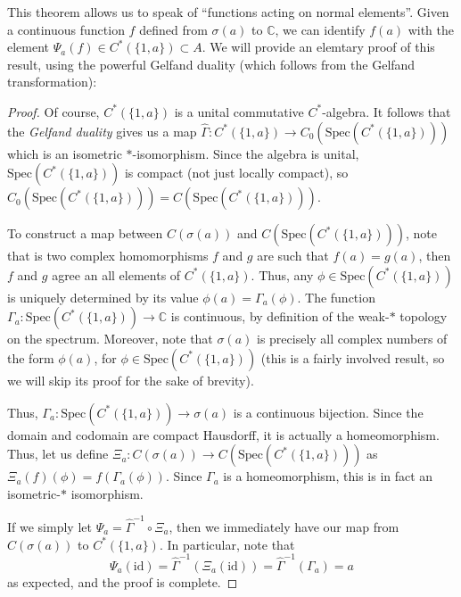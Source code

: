 \documentclass[aps,pra,showpacs,notitlepage,onecolumn,superscriptaddress,nofootinbib]{revtex4-1}
\theoremstyle{definition}
\begin{document}
\noindent This theorem allows us to speak of ``functions acting on normal elements''. Given a continuous function $f$ defined from $\sigma(a)$ to $\mathbb{C}$,
we can identify $f(a)$ with the element $\Psi_a(f) \in C^{*}(\{1, a\}) \subset A$. We will provide an elemtary proof of this result, using the powerful Gelfand duality (which follows from the Gelfand transformation):

\begin{proof}
  Of course, $C^{*}(\{1, a\})$ is a unital commutative $C^{*}$-algebra. It follows that the \emph{Gelfand duality} gives us a map $\widehat{\Gamma} : C^{*}(\{1, a\}) \rightarrow C_0(\text{Spec}(C^{*}(\{1, a\})))$
  which is an isometric $*$-isomorphism. Since the algebra is unital, $\text{Spec}(C^{*}(\{1, a\}))$ is compact (not just locally compact), so $C_0(\text{Spec}(C^{*}(\{1, a\}))) = C(\text{Spec}(C^{*}(\{1, a\})))$.
  \newline

  To construct a map between $C(\sigma(a))$ and $C(\text{Spec}(C^{*}(\{1, a\})))$, note that is two complex homomorphisms $f$ and $g$ are such that $f(a) = g(a)$, then $f$ and $g$
  agree an all elements of $C^{*}(\{1, a\})$. Thus, any $\phi \in \text{Spec}(C^{*}(\{1, a\}))$ is uniquely determined by its value $\phi(a) = \Gamma_a(\phi)$. The function $\Gamma_a : \text{Spec}(C^{*}(\{1, a\})) \rightarrow \mathbb{C}$
  is continuous, by definition of the weak-$*$ topology on the spectrum. Moreover, note that $\sigma(a)$ is precisely all complex numbers of the form $\phi(a)$, for $\phi \in \text{Spec}(C^{*}(\{1, a\}))$ (this is a fairly involved result, so
  we will skip its proof for the sake of brevity).
  \newline

  Thus, $\Gamma_a : \text{Spec}(C^{*}(\{1, a\})) \rightarrow \sigma(a)$ is a continuous bijection. Since the domain and codomain are compact Hausdorff, it is actually a homeomorphism.
  Thus, let us define $\Xi_a : C(\sigma(a)) \rightarrow C(\text{Spec}(C^{*}(\{1, a\})))$ as $\Xi_a(f)(\phi) = f(\Gamma_a(\phi))$. Since $\Gamma_a$ is a homeomorphism, this is in fact an
  isometric-$*$ isomorphism.
  \newline

  If we simply let $\Psi_a = \widehat{\Gamma}^{-1} \circ \Xi_a$, then we immediately have our map from $C(\sigma(a))$ to $C^{*}(\{1, a\})$. In particular, note that
  $$\Psi_{a}(\text{id}) = \widehat{\Gamma}^{-1}(\Xi_a(\text{id})) = \widehat{\Gamma}^{-1}(\Gamma_a) = a$$
  as expected, and the proof is complete.
  \end{proof}
\end{document}
